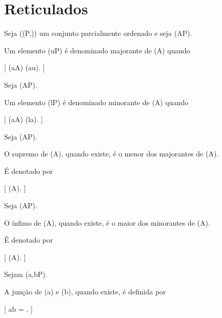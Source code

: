 \documentclass[../../main]{subfiles}
\begin{document}
\section{Reticulados}
\label{sec:matematica:relacoes:reticulados}

\begin{defn}[Majorante]
	\label{def:matematica:relacoes:reticulados:majorante}

	Seja ((P,\le)) um conjunto parcialmente ordenado e seja
	(A\subseteq P).

	Um elemento (u\in P) é denominado majorante de (A) quando

		[
			(\forall a\in A)
			(a\le u).
		]

\end{defn}

\begin{defn}[Minorante]
	\label{def:matematica:relacoes:reticulados:minorante}

	Seja (A\subseteq P).

	Um elemento (l\in P) é denominado minorante de (A) quando

		[
			(\forall a\in A)
			(l\le a).
		]

\end{defn}

\begin{defn}[Supremo]
	\label{def:matematica:relacoes:reticulados:supremo}

	Seja (A\subseteq P).

	O supremo de (A), quando existe, é o menor dos majorantes de (A).

	É denotado por

		[
			\sup(A).
		]

\end{defn}

\begin{defn}[Ínfimo]
	\label{def:matematica:relacoes:reticulados:infimo}

	Seja (A\subseteq P).

	O ínfimo de (A), quando existe, é o maior dos minorantes de (A).

	É denotado por

		[
			\inf(A).
		]

\end{defn}

\begin{defn}[Junção]
	\label{def:matematica:relacoes:reticulados:juncao}

	Sejam (a,b\in P).

	A junção de (a) e (b), quando existe, é definida por

		[
			a\vee b
			=
			.
		]

\end{defn}
\end{document}

